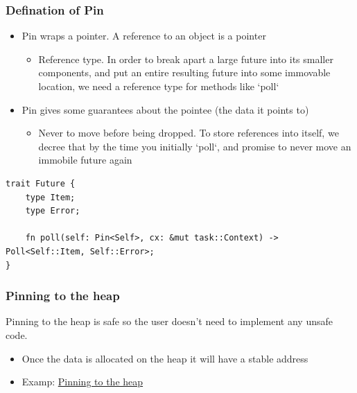 \begin{frame}[fragile]
    \frametitle{Defination of Pin}
% 
% 
    \begin{itemize}
        \item Pin wraps a pointer. A reference to an object is a pointer
    	\begin{itemize}
    	    \item {\color{red}Reference type}. In order to break apart a large future into its smaller components, and put  an entire resulting future into some immovable location, we need a reference type for methods like `poll`
    	\end{itemize} \pause
        \item Pin gives some guarantees about the {\color{red}pointee} (the data it points to)
    	\begin{itemize}
    	    \item {\color{red}Never to move before being dropped}. To store references into itself, we decree that by the time you initially `poll`, and promise to never move an immobile future again
    	\end{itemize}
    \end{itemize}
% 
\begin{block}{}
    \begin{verbatim}
trait Future {
    type Item;
    type Error;

    fn poll(self: Pin<Self>, cx: &mut task::Context) -> Poll<Self::Item, Self::Error>;
} \end{verbatim}
\end{block}
% 
\end{frame}
\begin{frame}[fragile]
    \frametitle{Pinning to the heap}
% 
% 
Pinning to the heap is safe so the user doesn't need to implement any unsafe code.
% 
    \begin{itemize}
        \item Once the data is allocated on the heap it will have a stable address \pause
        \item Examp: \href{https://cfsamson.github.io/books-futures-explained/4_pin.html}{Pinning to the heap}
    \end{itemize}

\end{frame}

